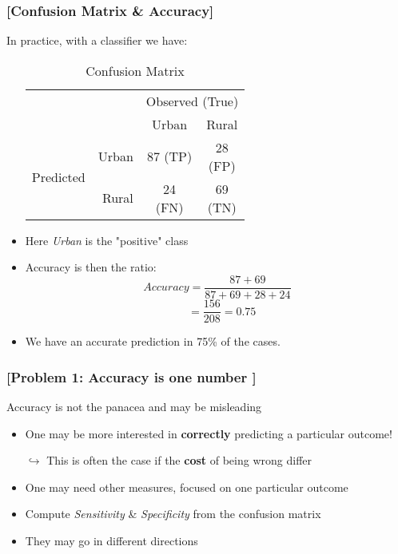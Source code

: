 \documentclass[xcolor=x11names,compress, handhouts]{beamer}
\renewcommand{\(}{\begin{columns}}
\renewcommand{\)}{\end{columns}}
\newcommand{\<}[1]{\begin{column}{#1}}
\renewcommand{\>}{\end{column}}
\begin{document}
\begin{frame} %
\frametitle{\textcolor{brique}{[Confusion Matrix  \& Accuracy]}}
In practice, with a classifier we have:
\begin{itemize}[<+->]
  \item[]
    \begin{table}[]
    \begin{tabular}{l r|c|c|}

                              & & \multicolumn{2}{c|}{Observed (True)}                                                                                          \\
                              & &    Urban  &  Rural  \\  \hline
    \multirow{2}{*}{Predicted}& Urban & \shortstack[c]{$87$ \\ \tiny{(TP)}}& \shortstack[c]{28 \\ \tiny{(FP)}} \\ \cline{2-4}
                              & Rural &  \shortstack[c]{24 \\ \tiny{(FN)}}& \shortstack[c]{69 \\ \tiny{(TN)}} \\ \hline
    \end{tabular}
    \caption{Confusion Matrix}
    \end{table}
  \item Here \textit{Urban} is the "positive" class
  \item Accuracy is then the ratio:
   $$ Accuracy = \frac{87 + 69}{ 87 + 69 + 28 + 24} $$
   $$
 \; \; \;  =  \frac{156}{208} = 0.75
 $$
  \item  We have an accurate prediction in 75\% of the cases.
\end{itemize}
\end{frame}



\begin{frame} %
\frametitle{\textcolor{brique}{[Problem 1: Accuracy is one number ]}}
Accuracy is not the panacea and may be misleading
\begin{itemize}[<+->]
    \item One may be more interested in \textbf{correctly} predicting a particular outcome!
    \item[$\hookrightarrow$] This is often the case if the \textbf{cost} of being wrong differ
    \item One may need other measures, focused on one particular outcome
    \item Compute \textit{Sensitivity}  \&  \textit{Specificity } from the confusion matrix
    \item They may go in different directions
\end{itemize}
\end{frame}
\end{document}
